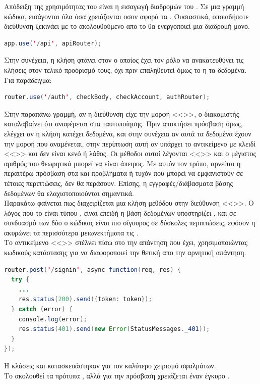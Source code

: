 \pSpace Απόδειξη της χρησιμότητας του  είναι η εισαγωγή διαδρομών του . Σε μια γραμμή κώδικα, εισάγονται όλα όσα χρειάζονται οσον αφορά τα . Ουσιαστικά, οποιαδήποτε διεύθυνση ξεκινάει με το  ακολουθούμενο απο το  θα ενεργοποιεί μια διαδρομή μονο.\\
	\begin{lstlisting}[language=Java]
	app.use('/api', apiRouter);
	\end{lstlisting}
\pSpace Στην συνέχεια, η κλήση φτάνει στον  ο οποίος έχει τον ρόλο να ανακατευθύνει τις κλήσεις στον τελικό προόρισμό τους, όχι πριν επαληθευτεί όμως το  η τα δεδομένα. Για παράδειγμα:\\
	\begin{lstlisting}[language=Java]
router.use('/auth', checkBody, checkAccount, authRouter);
	\end{lstlisting}
\pSpace Στην παραπάνω γραμμή, αν η διεύθυνση είχε την μορφή <<>>, ο διακομιστής καταλαβαίνει ότι αναφέρεται στα  ταυτοποίησης. Πριν αποκτήσει πρόσβαση όμως, ελέγχει αν η κλήση  κατέχει δεδομένα, και στην συνέχεια αν αυτά τα δεδομένα έχουν την μορφή που αναμένεται, στην περίπτωση αυτή αν υπάρχει το αντικείμενο με κλειδί <<>> και δεν είναι κενό ή λάθος. Οι μέθοδοι αυτοί λέγονται <<>> και ο μέγιστος αριθμός του θεωρητικά μπορεί να είναι άπειρος. Με αυτόν τον τρόπο, αρνείται η περαιτέρω πρόσβαση στα  και προβλήματα ή τυχόν  που μπορεί να εμφανιστούν σε τέτοιες περιπτώσεις, δεν θα περάσουν. Επίσης, η εγγραφές/διάβασματα βάσης δεδομένων θα ελαχιστοποιούνται σημαντικά.\\
\pSpace Παρακάτω φαίνεται πως διαχειρίζεται μια κλήση μεθόδου  στην διεύθυνση <<>>. Ο λόγος που το  είναι τύπου , είναι επειδή η βάση δεδομένων υποστηρίζει , και σε συνδυασμό των δύο ο κώδικας είναι πιο σίγουρος σε δύσκολες περιπτώσεις, εφόσον η  ακυρώνει τα περισσότερα μειωνεκτήματα τις .\\
\pSpace Το αντικείμενο <<>> στέλνει πίσω στο  την απάντηση που έχει, χρησιμοποιώντας κωδικούς κατάστασης για να διαφοροποιεί την θετική απο την αρνητική απάντηση.
	\begin{lstlisting}[language=Java]
router.post('/signin', async function(req, res) {
  try {
    ...
    res.status(200).send({token: token});
  } catch (error) {
    console.log(error);
    res.status(401).send(new Error(StatusMessages._401));
  }
});
	\end{lstlisting}
\pSpace Η κλάσεις  και  κατασκευάστηκαν για τον καλύτερο χειρισμό σφαλμάτων.\\
\pSpace Το  ακολουθεί τα πρότυπα , αλλά για την πρόσβαση χρειάζεται έναν έγκυρο .

